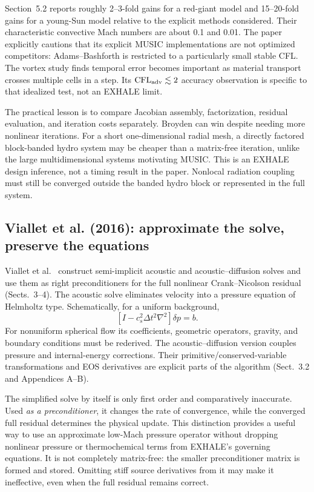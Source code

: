 \documentclass[english,a4paper]{my_memo}
\begin{document}
Section~5.2 reports roughly 2--3-fold gains for a red-giant model and 15--20-fold gains for a young-Sun model relative to the explicit methods considered. Their characteristic convective Mach numbers are about 0.1 and 0.01. The paper explicitly cautions that its explicit MUSIC implementations are not optimized competitors: Adams--Bashforth is restricted to a particularly small stable CFL. The vortex study finds temporal error becomes important as material transport crosses multiple cells in a step. Its $\mathrm{CFL}_{\rm adv}\lesssim2$ accuracy observation is specific to that idealized test, not an EXHALE limit.

The practical lesson is to compare Jacobian assembly, factorization, residual evaluation, and iteration costs separately. Broyden can win despite needing more nonlinear iterations. For a short one-dimensional radial mesh, a directly factored block-banded hydro system may be cheaper than a matrix-free iteration, unlike the large multidimensional systems motivating MUSIC. This is an EXHALE design inference, not a timing result in the paper. Nonlocal radiation coupling must still be converged outside the banded hydro block or represented in the full system.

\subsection{Viallet et al. (2016): approximate the solve, preserve the equations}
Viallet et al.\ \cite{viallet16} construct semi-implicit acoustic and acoustic--diffusion solves and use them as right preconditioners for the full nonlinear Crank--Nicolson residual (Sects.~3--4). The acoustic solve eliminates velocity into a pressure equation of Helmholtz type. Schematically, for a uniform background,
\begin{equation}
 \left[I-c_s^2\Delta t^2\nabla^2\right]\delta p=b.
\end{equation}
For nonuniform spherical flow its coefficients, geometric operators, gravity, and boundary conditions must be rederived. The acoustic--diffusion version couples pressure and internal-energy corrections. Their primitive/conserved-variable transformations and EOS derivatives are explicit parts of the algorithm (Sect.~3.2 and Appendices A--B).

The simplified solve by itself is only first order and comparatively inaccurate. Used \emph{as a preconditioner}, it changes the rate of convergence, while the converged full residual determines the physical update. This distinction provides a useful way to use an approximate low-Mach pressure operator without dropping nonlinear pressure or thermochemical terms from EXHALE's governing equations. It is not completely matrix-free: the smaller preconditioner matrix is formed and stored. Omitting stiff source derivatives from it may make it ineffective, even when the full residual remains correct.
\end{document}

